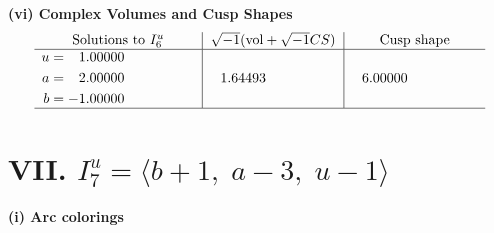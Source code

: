 \documentclass[1p]{elsarticle_modified}
\theoremstyle{definition}
\newcommand{\I}{\sqrt{-1}}
\begin{document}
\newpage\flushleft \textbf{(vi) Complex Volumes and Cusp Shapes}
$$\begin{array}{c|c|c}  
\text{Solutions to }I^u_{6}& \I (\text{vol} + \sqrt{-1}CS) & \text{Cusp shape}\\
 \hline 
\begin{aligned}
u &= \phantom{-}1.00000\phantom{ +0.000000I} \\
a &= \phantom{-}2.00000\phantom{ +0.000000I} \\
b &= -1.00000\phantom{ +0.000000I}\end{aligned}
 & \phantom{-}1.64493\phantom{ +0.000000I} & \phantom{-}6.00000\phantom{ +0.000000I}\\
 \hline 
 \end{array}$$\newpage\newpage\renewcommand{\arraystretch}{1}
\centering \section*{VII. $I^u_{7}= \langle b+1,\;a-3,\;u-1 \rangle$}
\flushleft \textbf{(i) Arc colorings}\\
\end{document}
